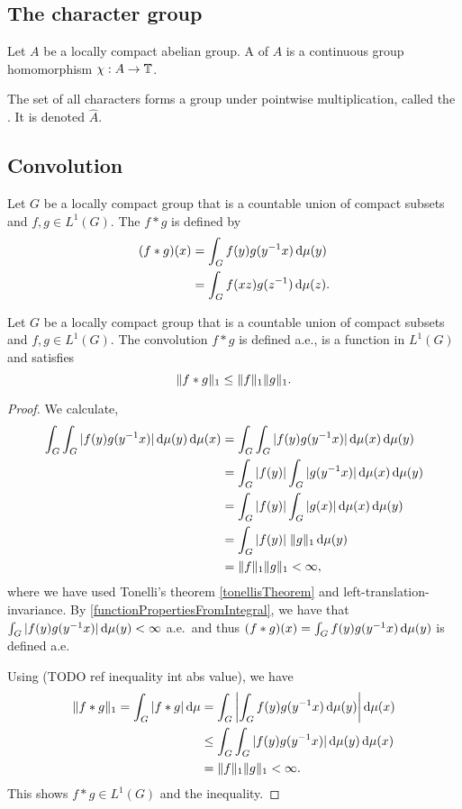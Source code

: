 \subsection{The character group}
\begin{definition}
Let $A$ be a locally compact abelian group. A  of $A$ is a continuous group homomorphism $\chi: A\to \mathbb{T}$.

The set of all characters forms a group under pointwise multiplication, called the . It is denoted $\widehat{A}$.
\end{definition}

\subsection{Convolution}
\begin{definition}
Let $G$ be a locally compact group that is a countable union of compact subsets and $f,g\in L^1(G)$. The  $f*g$ is defined by
\begin{align*}
(f*g)(x) &= \int_Gf(y)g(y^{-1}x)\operatorname{d \!}{\mu(y)} \\
&= \int_Gf(xz)g(z^{-1})\operatorname{d \!}{\mu(z)}.
\end{align*}
\end{definition}

\begin{lemma}
Let $G$ be a locally compact group that is a countable union of compact subsets and $f,g\in L^1(G)$.
The convolution $f*g$ is defined a.e., is a function in $L^1(G)$ and satisfies
\[ \lVert f*g\rVert_1 \leq \lVert f\rVert_1\lVert g\rVert_1. \]
\end{lemma}
\begin{proof}
We calculate,
\begin{align*}
\int_G\int_G |f(y)g(y^{-1}x)| \diff{\mu(y)}\diff{\mu(x)} &= \int_G\int_G |f(y)g(y^{-1}x)| \diff{\mu(x)}\diff{\mu(y)} \\
&= \int_G |f(y)| \int_G |g(y^{-1}x)| \diff{\mu(x)}\diff{\mu(y)} \\
&= \int_G |f(y)| \int_G |g(x)| \diff{\mu(x)}\diff{\mu(y)} \\
&= \int_G |f(y)| \;\norm{g}_1\diff{\mu(y)} \\
&= \norm{f}_1\norm{g}_1 <\infty,
\end{align*}
where we have used Tonelli's theorem \ref{tonellisTheorem} and left-translation-invariance. By \ref{functionPropertiesFromIntegral}, we have that $\int_G |f(y)g(y^{-1}x)| \operatorname{d \!}{\mu(y)}<\infty$ a.e.\ and thus $(f*g)(x) = \int_G f(y)g(y^{-1}x) \operatorname{d \!}{\mu(y)}$ is defined a.e.

Using (TODO ref inequality int abs value), we have
\begin{align*}
\lVert f*g\rVert_1 = \int_G|f*g|\operatorname{d \!}{\mu} &= \int_G\left|\int_G f(y)g(y^{-1}x) \operatorname{d \!}{\mu(y)}\right|\operatorname{d \!}{\mu(x)} \\
&\leq \int_G\int_G |f(y)g(y^{-1}x)| \operatorname{d \!}{\mu(y)}\operatorname{d \!}{\mu(x)} \\
&= \lVert f\rVert_1\lVert g\rVert_1 <\infty.
\end{align*}
This shows $f*g\in L^1(G)$ and the inequality.
\end{proof}

